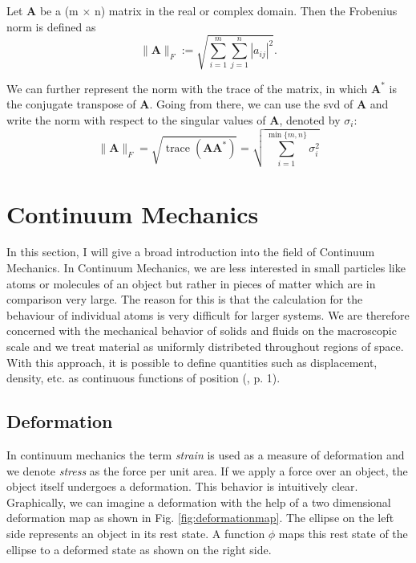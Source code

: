 \begin{definition}
\label{FN}
Let \textbf{A} be a (m $\times$ n) matrix in the real or complex domain. Then the Frobenius norm is defined as 
\[
\| \mathbf{A} \|_{F} := \sqrt{\sum\limits_{i=1}^{m} \sum\limits_{j=1}^{n} |a_{ij}|^2}.
\]
\end{definition}

We can further represent the norm with the trace of the matrix, in which $\mathbf{A}^*$ is the conjugate transpose of \textbf{A}. Going from there, we can use the \acrshort{svd} of \textbf{A} and write the norm with respect to the singular values of \textbf{A}, denoted by $\sigma_i$:
\begin{equation} \label{eq:FN}
\| \mathbf{A} \|_{F} = \sqrt{\operatorname{trace}(\mathbf{A} \mathbf{A}^*)} = \sqrt{\sum\limits_{i=1}^{\operatorname{min}\{m,n\}} \sigma_i^2}
\end{equation}


\section{Continuum Mechanics}
In this section, I will give a broad introduction into the field of Continuum Mechanics. In Continuum Mechanics, we are less interested in small particles like atoms or molecules of an object but rather in pieces of matter which are in comparison very large. The reason for this is that the calculation for the behaviour of individual atoms is very difficult for larger systems. We are therefore concerned with the mechanical behavior of solids and fluids on the macroscopic scale and we treat material as uniformly distribeted throughout regions of space. With this approach, it is possible to define quantities such as displacement, density, etc. as continuous functions of position (\cite{Spencer1980}, p. 1).


\subsection{Deformation}
In continuum mechanics the term \textit{strain} is used as a measure of deformation and we denote \textit{stress} as the force per unit area. If we apply a force over an object, the object itself undergoes a deformation. This behavior is intuitively clear. Graphically, we can imagine a deformation with the help of a two dimensional deformation map as shown in Fig. \ref{fig:deformationmap}. The ellipse on the left side represents an object in its rest state. A function $\phi$ maps this rest state of the ellipse to a deformed state as shown on the right side.

